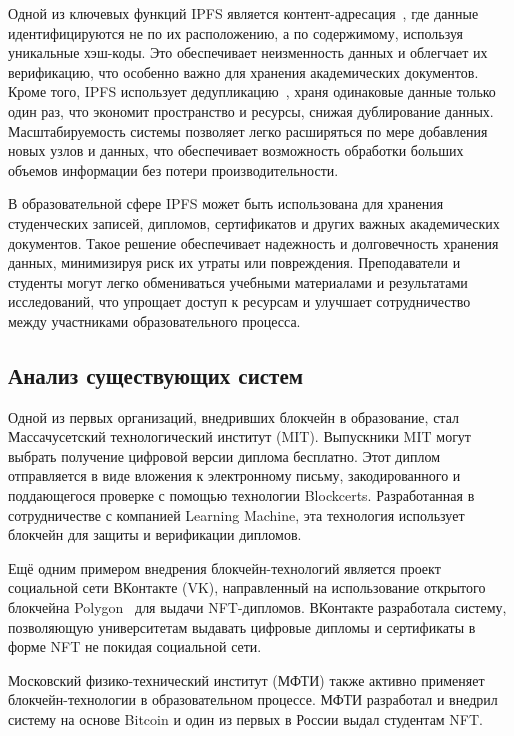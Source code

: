 Одной из ключевых функций IPFS является контент-адресация~\cite{bib:ipfs_2}, где данные идентифицируются не по их расположению, а по содержимому, используя уникальные хэш-коды. Это обеспечивает неизменность данных и облегчает их верификацию, что особенно важно для хранения академических документов. Кроме того, IPFS использует дедупликацию~\cite{bib:dedup}, храня одинаковые данные только один раз, что экономит пространство и ресурсы, снижая дублирование данных. Масштабируемость системы позволяет легко расширяться по мере добавления новых узлов и данных, что обеспечивает возможность обработки больших объемов информации без потери производительности.

В образовательной сфере IPFS может быть использована для хранения студенческих записей, дипломов, сертификатов и других важных академических документов. Такое решение обеспечивает надежность и долговечность хранения данных, минимизируя риск их утраты или повреждения. Преподаватели и студенты могут легко обмениваться учебными материалами и результатами исследований, что упрощает доступ к ресурсам и улучшает сотрудничество между участниками образовательного процесса.

\subsection{Анализ существующих систем}

Одной из первых организаций, внедривших блокчейн в образование, стал Массачусетский технологический институт (MIT). Выпускники MIT могут выбрать получение цифровой версии диплома бесплатно. Этот диплом отправляется в виде вложения к электронному письму, закодированного и поддающегося проверке с помощью технологии Blockcerts. Разработанная в сотрудничестве с компанией Learning Machine, эта технология использует блокчейн для защиты и верификации дипломов.~\cite{bib:mit_diplomas}

Ещё одним примером внедрения блокчейн-технологий является проект социальной сети ВКонтакте (VK), направленный на использование открытого блокчейна Polygon~\cite{bib:polygon} для выдачи NFT-дипломов. ВКонтакте разработала систему, позволяющую университетам выдавать цифровые дипломы и сертификаты в форме NFT не покидая социальной сети.~\cite{bib:vk_nft_diploma}

Московский физико-технический институт (МФТИ) также активно применяет блокчейн-технологии в образовательном процессе. МФТИ разработал и внедрил систему на основе Bitcoin и один из первых в России выдал студентам NFT.~\cite{bib:mipt_nft_diploma}

